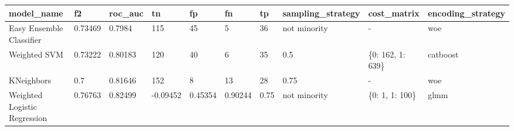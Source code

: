 \begin{tabular}{|l|l|l|l|l|l|l|l|l|l|}
\hline
\textbf{model\_name}         & \textbf{f2} & \textbf{roc\_auc} & \textbf{tn} & \textbf{fp} & \textbf{fn} & \textbf{tp} & \textbf{sampling\_strategy} & \textbf{cost\_matrix} & \textbf{encoding\_strategy} \\ \hline
Easy Ensemble Classifier     & 0.73469     & 0.7984            & 115         & 45          & 5           & 36          & not minority                & -                     & woe                         \\ \hline
Weighted SVM                 & 0.73222     & 0.80183           & 120         & 40          & 6           & 35          & 0.5                         & \{0: 162, 1: 639\}    & catboost                    \\ \hline
KNeighbors                   & 0.7         & 0.81646           & 152         & 8           & 13          & 28          & 0.75                        & -                     & woe                         \\ \hline
Weighted Logistic Regression & 0.76763     & 0.82499           & -0.09452    & 0.45354     & 0.90244     & 0.75        & not minority                & \{0: 1, 1: 100\}      & glmm                        \\ \hline
\end{tabular}
